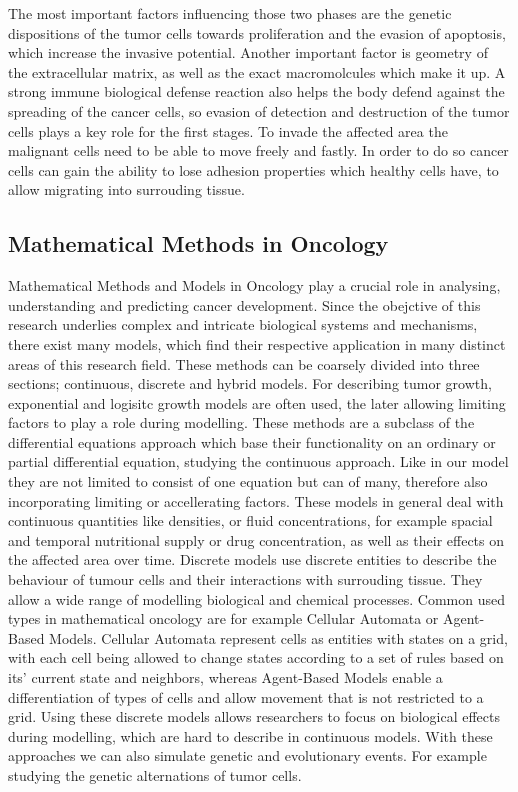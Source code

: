 The most important factors influencing those two phases are the genetic dispositions of the tumor cells towards proliferation and the evasion of apoptosis, which increase the invasive potential. Another important factor is geometry of the extracellular matrix, as well as the exact macromolcules which make it up. A strong immune biological defense reaction also helps the body defend against the spreading of the cancer cells, so evasion of detection and destruction of the tumor cells plays a key role for the first stages. To invade the affected area the malignant cells need to be able to move freely and fastly. In order to do so cancer cells can gain the ability to lose adhesion properties which healthy cells have, to allow migrating into surrouding tissue. 

\subsection{Mathematical Methods in Oncology}
Mathematical Methods and Models in Oncology play a crucial role in analysing, understanding and predicting cancer development. Since the obejctive of this research underlies complex and intricate biological systems and mechanisms, there exist many models, which find their respective application in many distinct areas of this research field. These methods can be coarsely divided into three sections; continuous, discrete and hybrid models. For describing tumor growth, exponential and logisitc growth models are often used, the later allowing limiting factors to play a role during modelling. These methods are a subclass of the differential equations approach which base their functionality on an ordinary or partial differential equation, studying the continuous approach. Like in our model they are not limited to consist of one equation but can of many, therefore also incorporating limiting or accellerating factors. These models in general deal with continuous quantities like densities, or fluid concentrations, for example spacial and temporal nutritional supply or drug concentration, as well as their effects on the affected area over time. Discrete models use discrete entities to describe the behaviour of tumour cells and their interactions with surrouding tissue. They allow a wide range of modelling biological and chemical processes. Common used types in mathematical oncology are for example Cellular Automata or Agent-Based Models. Cellular Automata represent cells as entities with states on a grid, with each cell being allowed to change states according to a set of rules based on its' current state and neighbors, whereas Agent-Based Models enable a differentiation of types of cells and allow movement that is not restricted to a grid. Using these discrete models allows researchers to focus on biological effects during modelling, which are hard to describe in continuous models. With these approaches we can also simulate genetic and evolutionary events. For example studying the genetic alternations of tumor cells.\newline 
